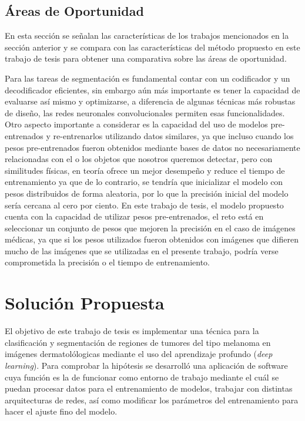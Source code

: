 \newpage

\section{Áreas de Oportunidad}
En esta sección se señalan las características de los trabajos mencionados en la sección anterior y se compara con las características del método propuesto en este trabajo de tesis para obtener una comparativa sobre las áreas de oportunidad.

Para las tareas de segmentación es fundamental contar con un codificador y un decodificador eficientes, sin embargo aún más importante es tener la capacidad de evaluarse así mismo y optimizarse, a diferencia de algunas técnicas más robustas de diseño, las redes neuronales convolucionales permiten esas funcionalidades. Otro aspecto importante a considerar es la capacidad del uso de modelos pre-entrenados y re-entrenarlos utilizando datos similares, ya que incluso cuando los pesos pre-entrenados fueron obtenidos mediante bases de datos no necesariamente relacionadas con el o los objetos que nosotros queremos detectar, pero con similitudes físicas, en teoría ofrece un mejor desempeño y reduce el tiempo de entrenamiento ya que de lo contrario, se tendría que inicializar el modelo con pesos distribuidos de forma aleatoria, por lo que la precisión inicial del modelo sería cercana al cero por ciento. En este trabajo de tesis, el modelo propuesto cuenta con la capacidad de utilizar pesos pre-entrenados, el reto está en seleccionar un conjunto de pesos que mejoren la precisión en el caso de imágenes médicas, ya que si los pesos utilizados fueron obtenidos con imágenes que difieren mucho de las imágenes que se utilizadas en el presente trabajo, podría verse comprometida la precisión o el tiempo de entrenamiento.

\chapter{Solución Propuesta}
El objetivo de este trabajo de tesis es implementar una técnica para la clasificación y segmentación de regiones de tumores del tipo melanoma en imágenes dermatolólogicas mediante el uso del aprendizaje profundo (\emph{deep learning}). Para comprobar la hipótesis se desarrolló una aplicación de software cuya función es la de funcionar como entorno de trabajo mediante el cuál se puedan procesar datos para el entrenamiento de modelos, trabajar con distintas arquitecturas de redes, así como modificar los parámetros del entrenamiento para hacer el ajuste fino del modelo.

